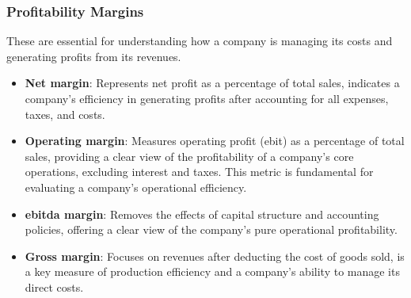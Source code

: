 \documentclass[11pt,english,a4paper,hidelinks]{book}
\begin{document}
\subsubsection{Profitability Margins}
These are essential for understanding how a company is managing its costs and generating profits from its revenues.
\begin{itemize}
    \item \textbf{Net margin}: Represents net profit as a percentage of total sales, indicates a company's efficiency in generating profits after accounting for all expenses, taxes, and costs.
    
    \item \textbf{Operating margin}: Measures operating profit (\acrshort{ebit}) as a percentage of total sales, providing a clear view of the profitability of a company's core operations, excluding interest and taxes. This metric is fundamental for evaluating a company's operational efficiency.
    
    \item \textbf{\acrshort{ebitda} margin}: Removes the effects of capital structure and accounting policies, offering a clear view of the company's pure operational profitability.
    
    \item \textbf{Gross margin}: Focuses on revenues after deducting the cost of goods sold, is a key measure of production efficiency and a company's ability to manage its direct costs.
\end{itemize}
\end{document}
